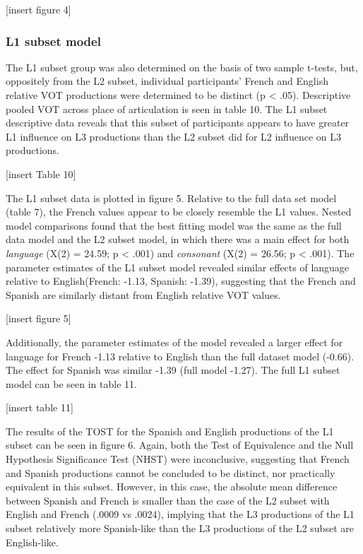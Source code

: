 \documentclass[
  english,
  man]{apa6}
\begin{document}
{[}insert figure 4{]}

\hypertarget{l1-subset-model}{%
\subsubsection{L1 subset model}\label{l1-subset-model}}

The L1 subset group was also determined on the basis of two sample t-tests, but, oppositely from the L2 subset, individual participants' French and English relative VOT productions were determined to be distinct (p \textless{} .05).
Descriptive pooled VOT across place of articulation is seen in table 10.
The L1 subset descriptive data reveals that this subset of participants appears to have greater L1 influence on L3 productions than the L2 subset did for L2 influence on L3 productions.

{[}insert Table 10{]}

The L1 subset data is plotted in figure 5.
Relative to the full data set model (table 7), the French values appear to be closely resemble the L1 values.
Nested model comparisons found that the best fitting model was the same as the full data model and the L2 subset model, in which there was a main effect for both \emph{language} (X(2) = 24.59; p \textless{} .001) and \emph{consonant} (X(2) = 26.56; p \textless{} .001).
The parameter estimates of the L1 subset model revealed similar effects of language relative to English(French: -1.13, Spanish: -1.39), suggesting that the French and Spanish are similarly distant from English relative VOT values.

{[}insert figure 5{]}

Additionally, the parameter estimates of the model revealed a larger effect for language for French -1.13 relative to English than the full dataset model (-0.66). The effect for Spanish was similar -1.39 (full model -1.27).
The full L1 subset model can be seen in table 11.

{[}insert table 11{]}

The results of the TOST for the Spanish and English productions of the L1 subset can be seen in figure 6. Again, both the Test of Equivalence and the Null Hypothesis Significance Test (NHST) were inconclusive, suggesting that French and Spanish productions cannot be concluded to be distinct, nor practically equivalent in this subset. However, in this case, the absolute mean difference between Spanish and French is smaller than the case of the L2 subset with English and French (.0009 vs .0024), implying that the L3 productions of the L1 subset relatively more Spanish-like than the L3 productions of the L2 subset are English-like.
\end{document}
